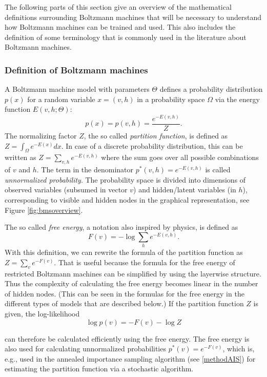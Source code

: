 \documentclass[12pt]{article}
\begin{document}
The following parts of this section give an overview of the mathematical definitions surrounding Boltzmann machines that will be necessary to understand how Boltzmann machines can be trained and used.
This also includes the definition of some terminology that is commonly used in the literature about Boltzmann machines.

\subsubsection{Definition of Boltzmann machines}\label{basicbmproperties}

A Boltzmann machine model with parameters $\Theta$ defines a probability distribution $p(x)$ for a random variable $x = (v, h)$ in a probability space $\Omega$ via the energy function $E(v, h; \Theta)$:
\begin{equation}
   p(x) = p(v, h) = \frac{e^{-E(v,h)}}{Z}.
   \label{eqn:probbm}
\end{equation}
The normalizing factor $Z$, the so called \emph{partition function}, is defined as $Z = \int_{\Omega} e^{-E(x)} dx$. In case of a discrete probability distribution, this can be written as $Z = \sum_{v,h}e^{-E(v,h)}$ where the sum goes over all possible combinations of $v$ and $h$.
The term in the denominator $p^*(v,h) = e^{-E(v,h)}$ is called \emph{unnormalized probability}.
The probability space is divided into dimensions of observed variables (subsumed in vector $v$) and hidden/latent variables (in $h$), corresponding to visible and hidden nodes in the graphical representation, see Figure \ref{fig:bmsoverview}.

The so called \emph{free energy}, a notation also inspired by physics, is defined as
\[
   F(v) = - \log \sum_h e^{-E(v, h)}.
\]
With this definition, we can rewrite the formula of the partition function as $Z = \sum_v e^{-F(v)}$.
That is useful because the formula for the free energy of restricted Boltzmann machines can be simplified by using the layerwise structure.
Thus the complexity of calculating the free energy becomes linear in the number of hidden nodes. (This can be seen in the formulas for the free energy in the different types of models that are described below.)
If the partition function $Z$ is given, the log-likelihood
\begin{equation}
   \log p(v) = - F(v) - \log Z
\label{eqn:pRBMfreeenergy}
\end{equation}

can therefore be calculated efficiently using the free energy. The free energy is also used for calculating unnormalized probabilities $p^*(v) = e^{-F(v)}$, which is, e.g., used in the annealed importance sampling algorithm (see \ref{methodAIS}) for estimating the partition function via a stochastic algorithm.
\end{document}
